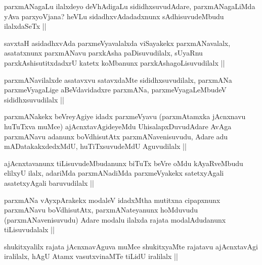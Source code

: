 \begin{artha}
parxmANagaLu ilalxdeyo deVhAdigaLu sididhxsuvudAdare, parxmANagaLiMda yAva parxyoVjana? heVLu sidadhxvAdadadxnunx sAdhisuvudeMbudu ilalxdaSeTx ||
\end{artha}

\begin{artha}
savxtaH asidadhxvAda parxmeVyavalalxda viSayakekx parxmANavalalx, asatatxnunx parxmANavu parxkAsha paDisuvudilalx, sUyaRnu parxkAshisutitxdadxrU katetx koMbanunx parxkAshagoLisuvudilalx ||
\end{artha}

\begin{artha}
parxmANavilalxde asatavxvu satavxdaMte sididhxsuvudilalx, parxmANa parxmeVyagaLige aBeVdavidadxre parxmANa, parxmeVyagaLeMbudeV sididhxsuvudilalx ||
\end{artha}

\begin{artha}
parxmANakekx beVreyAgiye idadx parxmeVyavu (parxmAtamxka jAcnxnavu huTuTxva muMce) ajAcnxtavAgideyeMdu UhisalapxDuvudAdare AvAga parxmANavu adanunx boVdhisutAtx parxmANavenisuvudu, Adare adu mADatakakxdedxMdU, huTiTxsuvudeMdU Aguvudilalx ||
\end{artha}

\begin{artha}
ajAcnxtavanunx tiLisuvudeMbudanunx biTuTx beVre oMdu kAyaRveMbudu elilxyU ilalx, adariMda parxmANadiMda parxmeVyakekx satetxyAgali asatetxyAgali baruvudilalx ||
\end{artha}

\begin{artha}
parxmANa vAyxpArakekx modaleV idadxMtha mutitxna cipapxnunx parxmANavu boVdhisutAtx, parxmANateyanunx hoMduvudu (parxmANavenisuvudu) Adare modalu ilalxda rajata modalAdudanunx tiLisuvudalalx ||
\end{artha}

\begin{artha}
shukitxyalilx rajata jAcnxnavAguva muMce shukitxyaMte rajatavu ajAcnxtavAgi iralilalx, hAgU Atamx vasutxvinaMTe tiLidU iralilalx ||
\end{artha}

